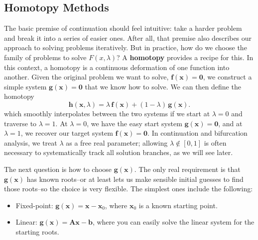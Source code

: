 \subsection{Homotopy Methods}
The basic premise of continuation should feel intuitive: take a harder problem and break it into a series of easier ones. After all, that premise also describes our approach to solving problems iteratively. But in practice, how do we choose the family of problems to solve $F(x, \lambda)$? A \textbf{homotopy} provides a recipe for this. In this context, a homotopy is a continuous deformation of one function into another. Given the original problem we want to solve, $\mathbf{f}(\mathbf{x}) = \mathbf{0}$, we construct a simple system $\mathbf{g}(\mathbf{x}) = \mathbf{0}$ that we know how to solve. We can then define the homotopy
\begin{equation}
    \mathbf{h}(\mathbf{x}, \lambda) = \lambda\,\mathbf{f}(\mathbf{x}) + (1-\lambda)\,\mathbf{g}(\mathbf{x}).
\end{equation}
which smoothly interpolates between the two systems if we start at \(\lambda=0\) and traverse to \(\lambda=1\). 
At $\lambda=0$, we have the easy start system $\mathbf{g}(\mathbf{x}) = \mathbf{0}$, and at $\lambda=1$, we recover our target system $\mathbf{f}(\mathbf{x}) = \mathbf{0}$. 
In continuation and bifurcation analysis, we treat \(\lambda\) as a free real parameter; allowing \(\lambda\notin[0,1]\) is often necessary to systematically track all solution branches, as we will see later. 

The next question is how to choose $\mathbf{g}(\mathbf{x})$. The only real requirement is that $\mathbf{g}(\mathbf{x})$ has known roots--or at least lets us make sensible initial guesses to find those roots--so the choice is very flexible. The simplest ones include the following:
\begin{itemize}
    \item Fixed-point: $\mathbf{g}(\mathbf{x}) = \mathbf{x} - \mathbf{x}_0$, where $\mathbf{x}_0$ is a known starting point.
    \item Linear: $\mathbf{g}(\mathbf{x}) = \mathbf{A}\mathbf{x} - \mathbf{b}$, where you can easily solve the linear system for the starting roots.
\end{itemize}

